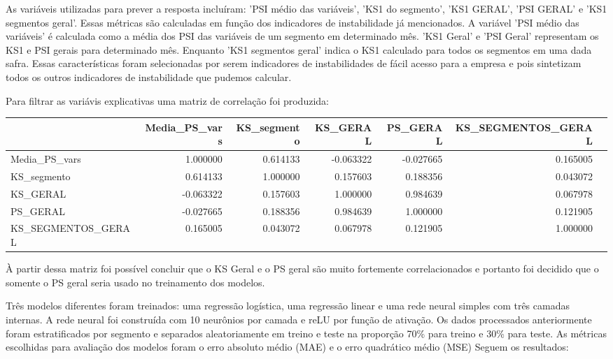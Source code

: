 	As variáveis utilizadas para prever a resposta incluíram: 'PSI médio das variáveis', 'KS1 do segmento', 'KS1 GERAL', 'PSI GERAL' e 'KS1 segmentos geral'. Essas métricas são calculadas em função dos indicadores de instabilidade já mencionados. A variável 'PSI médio das variáveis' é calculada como a média dos PSI das variáveis de um segmento em determinado mês. 'KS1 Geral' e 'PSI Geral' representam os KS1 e PSI gerais para determinado mês. Enquanto 'KS1 segmentos geral' indica o KS1 calculado para todos os segmentos em uma dada safra. Essas características foram selecionadas por serem indicadores de instabilidades de fácil acesso para a empresa e pois sintetizam todos os outros indicadores de instabilidade que pudemos calcular.

    Para filtrar as variávis explicativas uma matriz de correlação foi produzida:

\begin{adjustwidth}{-10in}{}
\begin{table}[H]
\fontsize{8}{12}\selectfont %
\setlength{\tabcolsep}{3pt} %
\begin{tabular}{lrrrrrr}
\toprule
{} &  Media\_PS\_vars &  KS\_segmento &  KS\_GERAL &  PS\_GERAL &  KS\_SEGMENTOS\_GERAL \\
\midrule
Media\_PS\_vars      &       1.000000 &     0.614133 & -0.063322 & -0.027665 &            0.165005\\
KS\_segmento        &       0.614133 &     1.000000 &  0.157603 &  0.188356 &            0.043072\\
KS\_GERAL           &      -0.063322 &     0.157603 &  1.000000 &  0.984639 &            0.067978 \\
PS\_GERAL           &      -0.027665 &     0.188356 &  0.984639 &  1.000000 &            0.121905 \\
KS\_SEGMENTOS\_GERAL &       0.165005 &     0.043072 &  0.067978 &  0.121905 &            1.000000 \\
\bottomrule
\end{tabular}
\end{table}
\end{adjustwidth}

À partir dessa matriz foi possível concluir que o KS Geral e o PS geral são muito fortemente correlacionados e portanto foi decidido que o somente o PS geral seria usado no treinamento dos modelos.

Três modelos diferentes foram treinados: uma regressão logística, uma regressão linear e uma rede neural simples com três camadas internas. A rede neural foi construída com 10 neurônios por camada e reLU por função de ativação. Os dados processados anteriormente foram estratificados por segmento e separados aleatoriamente em treino e teste na proporção 70\% para treino e 30\% para teste. As métricas escolhidas para avaliação dos modelos foram o erro absoluto médio (MAE) e o erro quadrático médio (MSE)
 Seguem os resultados:

